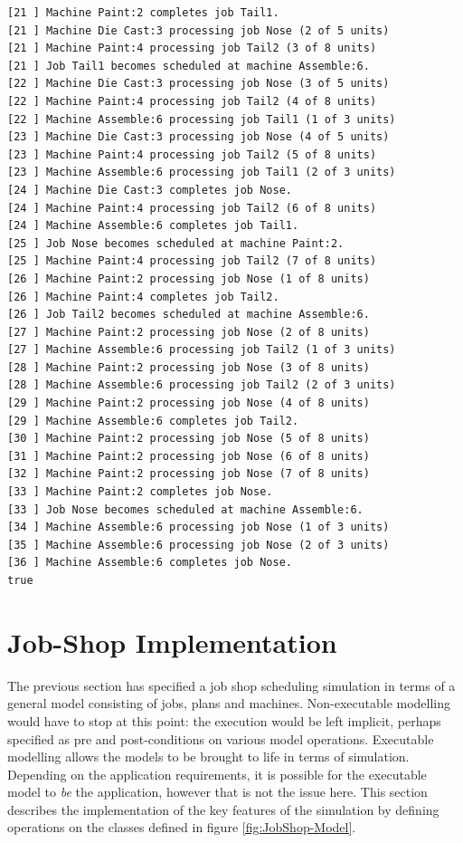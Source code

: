 \begin{lstlisting}
[21 ] Machine Paint:2 completes job Tail1.
[21 ] Machine Die Cast:3 processing job Nose (2 of 5 units)
[21 ] Machine Paint:4 processing job Tail2 (3 of 8 units)
[21 ] Job Tail1 becomes scheduled at machine Assemble:6.
[22 ] Machine Die Cast:3 processing job Nose (3 of 5 units)
[22 ] Machine Paint:4 processing job Tail2 (4 of 8 units)
[22 ] Machine Assemble:6 processing job Tail1 (1 of 3 units)
[23 ] Machine Die Cast:3 processing job Nose (4 of 5 units)
[23 ] Machine Paint:4 processing job Tail2 (5 of 8 units)
[23 ] Machine Assemble:6 processing job Tail1 (2 of 3 units)
[24 ] Machine Die Cast:3 completes job Nose.
[24 ] Machine Paint:4 processing job Tail2 (6 of 8 units)
[24 ] Machine Assemble:6 completes job Tail1.
[25 ] Job Nose becomes scheduled at machine Paint:2.
[25 ] Machine Paint:4 processing job Tail2 (7 of 8 units)
[26 ] Machine Paint:2 processing job Nose (1 of 8 units)
[26 ] Machine Paint:4 completes job Tail2.
[26 ] Job Tail2 becomes scheduled at machine Assemble:6.
[27 ] Machine Paint:2 processing job Nose (2 of 8 units)
[27 ] Machine Assemble:6 processing job Tail2 (1 of 3 units)
[28 ] Machine Paint:2 processing job Nose (3 of 8 units)
[28 ] Machine Assemble:6 processing job Tail2 (2 of 3 units)
[29 ] Machine Paint:2 processing job Nose (4 of 8 units)
[29 ] Machine Assemble:6 completes job Tail2.
[30 ] Machine Paint:2 processing job Nose (5 of 8 units)
[31 ] Machine Paint:2 processing job Nose (6 of 8 units)
[32 ] Machine Paint:2 processing job Nose (7 of 8 units)
[33 ] Machine Paint:2 completes job Nose.
[33 ] Job Nose becomes scheduled at machine Assemble:6.
[34 ] Machine Assemble:6 processing job Nose (1 of 3 units)
[35 ] Machine Assemble:6 processing job Nose (2 of 3 units)
[36 ] Machine Assemble:6 completes job Nose.
true
\end{lstlisting}
\section{Job-Shop Implementation}

\label{sec:Job-Shop-Implementation}

The previous section has specified a job shop scheduling simulation
in terms of a general model consisting of jobs, plans and machines.
Non-executable modelling would have to stop at this point: the execution
would be left implicit, perhaps specified as pre and post-conditions
on various model operations. Executable modelling allows the models
to be brought to life in terms of simulation. Depending on the application
requirements, it is possible for the executable model to \emph{be}
the application, however that is not the issue here. This section
describes the implementation of the key features of the simulation
by defining operations on the classes defined in figure \ref{fig:JobShop-Model}.


